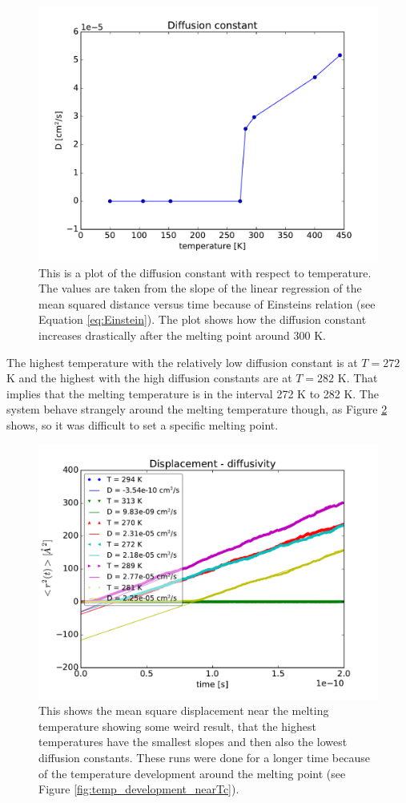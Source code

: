 \begin{figure}[H]
\center
\includegraphics[width=0.7\linewidth]{../figures/diffusion_temp}\caption{This is a plot of the diffusion constant with respect to temperature. The values are taken from the slope of the linear regression of the mean squared distance versus time because of Einsteins relation (see Equation \ref{eq:Einstein}). The plot shows how the diffusion constant increases drastically after the melting point around 300 K.}\label{fig:diffusion_temp}
\end{figure}


The highest temperature with the relatively low diffusion constant is at $T = 272$ K and the highest with the high diffusion constants are at $T = 282$ K. That implies that the melting temperature is in the interval 272 K to 282 K. The system behave strangely around the melting temperature though, as Figure \ref{fig:near_Tc} shows, so it was difficult to set a specific melting point.

\begin{figure}[H]
\center
\includegraphics[width=0.7\linewidth]{../figures/nearTc}\caption{This shows the mean square displacement near the melting temperature showing some weird result, that the highest temperatures have the smallest slopes and then also the lowest diffusion constants. These runs were done for a longer time because of the temperature development around the melting point (see Figure \ref{fig:temp_development_nearTc}).}\label{fig:near_Tc}
\end{figure}

